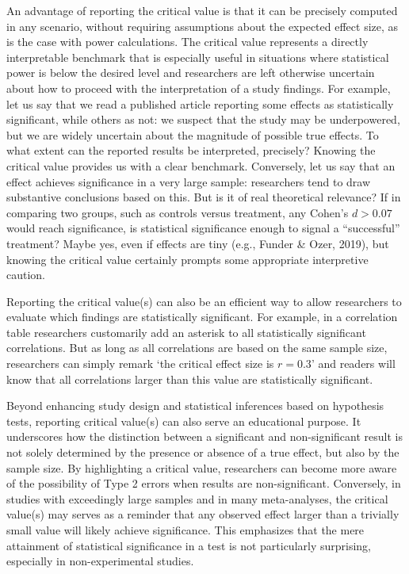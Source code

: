 \documentclass[
  man]{apa7}
\begin{document}
An advantage of reporting the critical value is that it can be precisely computed in any scenario, without requiring assumptions about the expected effect size, as is the case with power calculations. The critical value represents a directly interpretable benchmark that is especially useful in situations where statistical power is below the desired level and researchers are left otherwise uncertain about how to proceed with the interpretation of a study findings. For example, let us say that we read a published article reporting some effects as statistically significant, while others as not: we suspect that the study may be underpowered, but we are widely uncertain about the magnitude of possible true effects. To what extent can the reported results be interpreted, precisely? Knowing the critical value provides us with a clear benchmark. Conversely, let us say that an effect achieves significance in a very large sample: researchers tend to draw substantive conclusions based on this. But is it of real theoretical relevance? If in comparing two groups, such as controls versus treatment, any Cohen's \(d > 0.07\) would reach significance, is statistical significance enough to signal a ``successful'' treatment? Maybe yes, even if effects are tiny (e.g., Funder \& Ozer, 2019), but knowing the critical value certainly prompts some appropriate interpretive caution.

Reporting the critical value(s) can also be an efficient way to allow researchers to evaluate which findings are statistically significant. For example, in a correlation table researchers customarily add an asterisk to all statistically significant correlations. But as long as all correlations are based on the same sample size, researchers can simply remark `the critical effect size is \(r = 0.3\)' and readers will know that all correlations larger than this value are statistically significant.

Beyond enhancing study design and statistical inferences based on hypothesis tests, reporting critical value(s) can also serve an educational purpose. It underscores how the distinction between a significant and non-significant result is not solely determined by the presence or absence of a true effect, but also by the sample size. By highlighting a critical value, researchers can become more aware of the possibility of Type 2 errors when results are non-significant. Conversely, in studies with exceedingly large samples and in many meta-analyses, the critical value(s) may serves as a reminder that any observed effect larger than a trivially small value will likely achieve significance. This emphasizes that the mere attainment of statistical significance in a test is not particularly surprising, especially in non-experimental studies.
\end{document}
